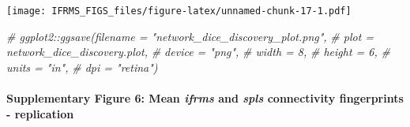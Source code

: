 \documentclass[
]{article}
\newenvironment{Shaded}{\begin{snugshade}}{\end{snugshade}}
\newcommand{\CommentTok}[1]{\textcolor[rgb]{0.56,0.35,0.01}{\textit{#1}}}
\begin{document}
\texttt{[image: IFRMS\_FIGS\_files/figure-latex/unnamed-chunk-17-1.pdf]}

\begin{Shaded}
\begin{Highlighting}[]
\CommentTok{# ggplot2::ggsave(filename = "network_dice_discovery_plot.png",}
\CommentTok{#                 plot = network_dice_discovery.plot,}
\CommentTok{#                 device = "png",}
\CommentTok{#                 width = 8,}
\CommentTok{#                 height = 6, }
\CommentTok{#                 units = "in",}
\CommentTok{#                 dpi = "retina")}
\end{Highlighting}
\end{Shaded}

\hypertarget{supplementary-figure-6-mean-ifrms-and-spls-connectivity-fingerprints---replication}{%
\paragraph{\texorpdfstring{Supplementary Figure 6: Mean \emph{ifrms} and
\emph{spls} connectivity fingerprints -
replication}{Supplementary Figure 6: Mean ifrms and spls connectivity fingerprints - replication}}\label{supplementary-figure-6-mean-ifrms-and-spls-connectivity-fingerprints---replication}}
\end{document}
